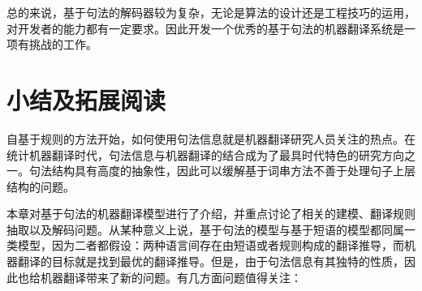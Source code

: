 \parinterval 总的来说，基于句法的解码器较为复杂，无论是算法的设计还是工程技巧的运用，对开发者的能力都有一定要求。因此开发一个优秀的基于句法的机器翻译系统是一项有挑战的工作。

\sectionnewpage
\section{小结及拓展阅读}

\parinterval 自基于规则的方法开始，如何使用句法信息就是机器翻译研究人员关注的热点。在统计机器翻译时代，句法信息与机器翻译的结合成为了最具时代特色的研究方向之一。句法结构具有高度的抽象性，因此可以缓解基于词串方法不善于处理句子上层结构的问题。

\parinterval 本章对基于句法的机器翻译模型进行了介绍，并重点讨论了相关的建模、翻译规则抽取以及解码问题。从某种意义上说，基于句法的模型与基于短语的模型都同属一类模型，因为二者都假设：两种语言间存在由短语或者规则构成的翻译推导，而机器翻译的目标就是找到最优的翻译推导。但是，由于句法信息有其独特的性质，因此也给机器翻译带来了新的问题。有几方面问题值得关注：

